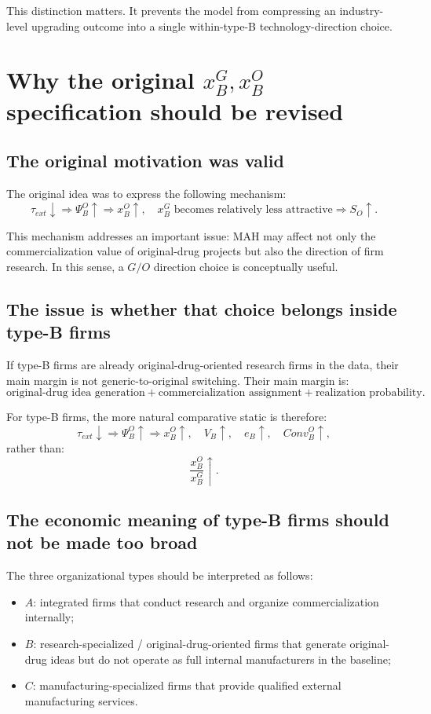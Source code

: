 \documentclass[12pt]{article}
\begin{document}
This distinction matters. It prevents the model from compressing an industry-level upgrading outcome into a single within-type-B technology-direction choice.

\section{Why the original $x_B^G,x_B^O$ specification should be revised}

\subsection{The original motivation was valid}

The original idea was to express the following mechanism:
\[
\tau_{ext}\downarrow
\Rightarrow
\Psi_B^O\uparrow
\Rightarrow
x_B^O\uparrow,\quad x_B^G \text{ becomes relatively less attractive}
\Rightarrow
S_O\uparrow.
\]

This mechanism addresses an important issue: MAH may affect not only the commercialization value of original-drug projects but also the direction of firm research. In this sense, a $G/O$ direction choice is conceptually useful.

\subsection{The issue is whether that choice belongs inside type-B firms}

If type-B firms are already original-drug-oriented research firms in the data, their main margin is not generic-to-original switching. Their main margin is:
\[
\text{original-drug idea generation}
+
\text{commercialization assignment}
+
\text{realization probability}.
\]

For type-B firms, the more natural comparative static is therefore:
\[
\tau_{ext}\downarrow
\Rightarrow
\Psi_B^O\uparrow
\Rightarrow
x_B^O\uparrow,\quad V_B\uparrow,\quad e_B\uparrow,\quad Conv_B^O\uparrow,
\]
rather than:
\[
\frac{x_B^O}{x_B^G}\uparrow.
\]

\subsection{The economic meaning of type-B firms should not be made too broad}

The three organizational types should be interpreted as follows:
\begin{itemize}
    \item $A$: integrated firms that conduct research and organize commercialization internally;
    \item $B$: research-specialized / original-drug-oriented firms that generate original-drug ideas but do not operate as full internal manufacturers in the baseline;
    \item $C$: manufacturing-specialized firms that provide qualified external manufacturing services.
\end{itemize}
\end{document}

